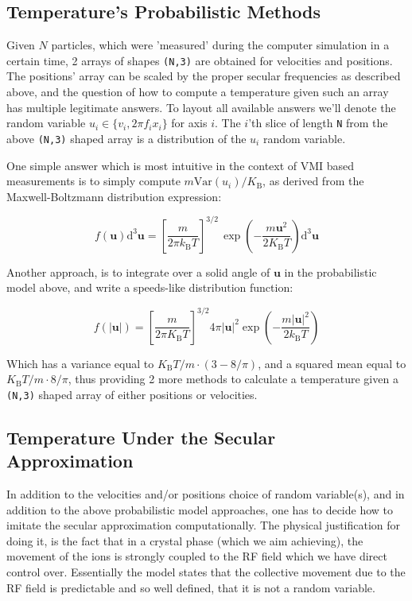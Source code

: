 \subsection{Temperature's Probabilistic Methods}

Given $N$ particles, which were 'measured' during the computer simulation in a certain time, 2 arrays of shapes \texttt{(N,3)} are obtained for velocities and positions. The positions' array can be scaled by the proper secular frequencies as described above, and the question of how to compute a temperature given such an array has multiple legitimate answers. To layout all available answers we'll denote the random variable $u_i \in \{v_i, 2\pi f_i x_i\}$ for axis $i$. The $i$'th slice of length \texttt{N} from the above \texttt{(N,3)} shaped array is a distribution of the $u_i$ random variable.

One simple answer which is most intuitive in the context of VMI based measurements is to simply compute $m \mathrm{Var}(u_i)/K_\text{B}$, as derived from the Maxwell-Boltzmann distribution expression:

\begin{equation}
	f(\mathbf{u}) \mathrm{d}^{3}\mathbf{u} = \left[\frac{m}{2\pi k_{\text{B}}T}\right]^{3/2}\,\exp \left(-{\frac {m \mathbf{u}^2}{2K_\text{B} T}}\right) \mathrm{d}^{3}\mathbf{u}
\end{equation}

Another approach, is to integrate over a solid angle of $\mathbf{u}$ in the probabilistic model above, and write a speeds-like distribution function:

\begin{equation}
	f(|\mathbf{u}|) = \left[{\frac{m}{2\pi K_\text{B} T}}\right]^{3/2} 4\pi |\mathbf{u}|^{2}\exp\left(-{\frac{m |\mathbf{u}|^{2}}{2k_{\text{B}}T}}\right)
\end{equation}

Which has a variance equal to $K_\text{B} T/m \cdot (3 - 8/\pi)$, and a squared mean equal to $K_\text{B} T/m \cdot 8/\pi$, thus providing 2 more methods to calculate a temperature given a \texttt{(N,3)} shaped array of either positions or velocities.

\subsection{Temperature Under the Secular Approximation}\label{ssec:T_rf_type}

In addition to the velocities and/or positions choice of random variable(s), and in addition to the above probabilistic model approaches, one has to decide how to imitate the secular approximation computationally. The physical justification for doing it, is the fact that in a crystal phase (which we aim achieving), the movement of the ions is strongly coupled to the RF field which we have direct control over. Essentially the model states that the collective movement due to the RF field is predictable and so well defined, that it is not a random variable.

